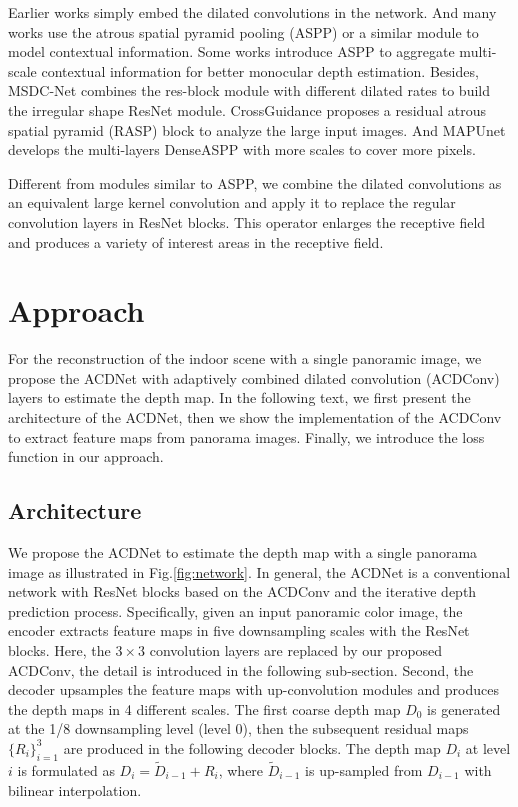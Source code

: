 \documentclass[letterpaper]{article} \usepackage{aaai21}  \usepackage{times}  \usepackage{helvet} \usepackage{courier}  \usepackage[hyphens]{url}  \usepackage{graphicx} \urlstyle{rm} \def\UrlFont{\rm}  \usepackage{natbib}  \usepackage{caption} \frenchspacing  \setlength{\pdfpagewidth}{8.5in}  \setlength{\pdfpageheight}{11in}
\begin{document}
Earlier works \cite{DBLP:conf/cvpr/YuKF17,DBLP:conf/pcm/MaDWZL18} simply embed the dilated convolutions in the network. And many works use the atrous spatial pyramid pooling (ASPP) \cite{DBLP:journals/pami/ChenPKMY18} or a similar module to model contextual information. Some works \cite{DBLP:conf/cvpr/FuGWBT18,DBLP:conf/wacv/FangCCG20,DBLP:conf/eccv/ZhangYWCW20,DBLP:journals/corr/abs-2106-08615} introduce ASPP to aggregate multi-scale contextual information for better monocular depth estimation. Besides, MSDC-Net \cite{DBLP:journals/access/TianZRWHH19} combines the res-block module with different dilated rates to build the irregular shape ResNet \cite{DBLP:conf/cvpr/HeZRS16} module. CrossGuidance \cite{DBLP:journals/access/LeeLKK20} proposes a residual atrous spatial pyramid (RASP) block to analyze the large input images. And MAPUnet \cite{DBLP:journals/access/YangWZZSY21} develops the multi-layers DenseASPP with more scales to cover more pixels. 

Different from modules similar to ASPP, we combine the dilated convolutions as an equivalent large kernel convolution and apply it to replace the regular convolution layers in ResNet blocks. This operator enlarges the receptive field and produces a variety of interest areas in the receptive field.


\section{Approach}

For the reconstruction of the indoor scene with a single panoramic image, we propose the ACDNet with adaptively combined dilated convolution (ACDConv) layers to estimate the depth map.
In the following text, we first present the architecture of the ACDNet, then we show the implementation of the ACDConv to extract feature maps from panorama images. Finally, we introduce the loss function in our approach.

\subsection{Architecture}

We propose the ACDNet to estimate the depth map with a single panorama image as illustrated in Fig.\ref{fig:network}. In general, the ACDNet is a conventional network with ResNet blocks based on the ACDConv and the iterative depth prediction process. Specifically, given an input panoramic color image, the encoder extracts feature maps in five downsampling scales with the ResNet blocks. Here, the $3\times3$ convolution layers are replaced by our proposed ACDConv, the detail is introduced in the following sub-section. Second, the decoder upsamples the feature maps with up-convolution modules \cite{DBLP:conf/3dim/LainaRBTN16} and produces the depth maps in 4 different scales. The first coarse depth map $D_0$ is generated at the 1/8 downsampling level (level $0$), then the subsequent residual maps $\{R_i\}_{i=1}^3$ are produced in the following decoder blocks. The depth map $D_i$ at level $i$ is formulated as $D_i = \tilde{D}_{i-1}+R_i$, where $\tilde{D}_{i-1}$ is up-sampled from $D_{i-1}$ with bilinear interpolation.
\end{document}
